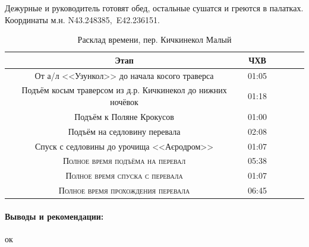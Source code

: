 Дежурные и руководитель готовят обед, остальные сушатся и греются в палатках. Координаты м.н. N43.248385\degree,~E42.236151\degree.

\begin{table}[h!]
	\centering
	\begin{tabular}{|c|c|c|c|c|c|} 
		\hline 
		Этап & ЧХВ \\ 	
		\hline 
		От а/л <<Узункол>> до начала косого траверса  & 01:05 \\
		Подъём косым траверсом из д.р. Кичкинекол до нижних ночёвок  & 01:18 \\
		Подъём к Поляне Крокусов & 01:00\\ 
		Подъём на седловину перевала & 02:08\\ 
		Спуск с седловины до урочища <<Аєродром>> & 01:07 \\
		
		\hline
		\textsc{Полное время подъёма на перевал  }& 05:38\\
		\textsc{Полное время спуска с перевала }& 01:07 \\
		\textsc{	Полное время прохождения перевала }& 06:45 \\
		\hline
	\end{tabular}
	\caption{Расклад времени, пер. Кичкинекол Малый}
\end{table}

\paragraph{Выводы и рекомендации:} ок

\clearpage
